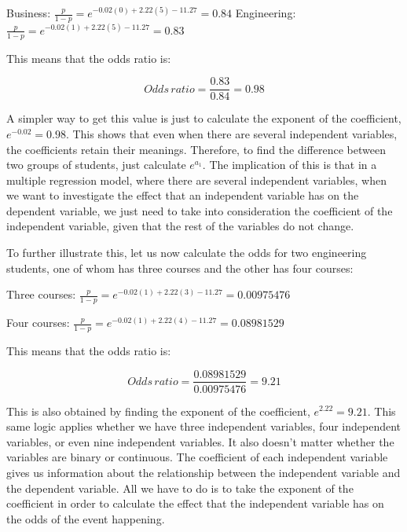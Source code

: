\documentclass[a4paper,12pt,oneside]{book}
\begin{document}
Business: $ \frac{p}{1-p}=e^{-0.02(0)+2.22(5)-11.27}=0.84 $
Engineering: $ \frac{p}{1-p}=e^{-0.02(1)+2.22(5)-11.27}=0.83 $

This means that the odds ratio is:

$$ Odds\, ratio = \frac{0.83}{0.84}=0.98 $$

A simpler way to get this value is just to calculate the exponent of the coefficient, $e^{-0.02}=0.98$. This shows that even when there are several independent variables, the coefficients 
retain their meanings. Therefore, to find the difference between two groups of students, just calculate $e^{a_1}$. The implication of this is that in a multiple regression model, where there are 
several independent variables, when we want to investigate the effect that an independent variable has on the dependent variable, we just need to take into consideration the coefficient of the 
independent variable, given that the rest of the variables do not change.

To further illustrate this, let us now calculate the odds for two engineering students, one of whom has three courses and the other has four courses:

Three courses: $ \frac{p}{1-p}=e^{-0.02(1)+2.22(3)-11.27}=0.00975476 $

Four courses: $ \frac{p}{1-p}=e^{-0.02(1)+2.22(4)-11.27}=0.08981529 $ 

This means that the odds ratio is:

$$ Odds\, ratio=\frac{0.08981529}{0.00975476}=9.21 $$

This is also obtained by finding the exponent of the coefficient, $e^{2.22}=9.21$. This same logic applies whether we have three independent variables, four independent variables, or even nine 
independent variables. It also doesn’t matter whether the variables are binary or continuous. The coefficient of each independent variable gives us information about the relationship between 
the independent variable and the dependent variable. All we have to do is to take the exponent of the coefficient in order to calculate the effect that the independent variable has on the odds of the event happening.
\end{document}
